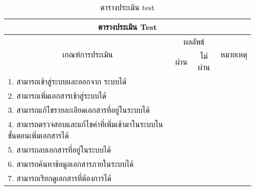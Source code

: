 \begin{table}[H]
\caption{ตารางประเมิน test}\label{tbl:test}
\begin{tabular}{|l|l|l|l|}
\hline
\multicolumn{4}{|c|}{ตารางประเมิน Test}                                                                                                                                             \\ \hline
\multicolumn{1}{|c|}{\multirow{2}{*}{เกณฑ์การประเมิน}}                  & \multicolumn{2}{c|}{ผลลัพธ์}                             & \multicolumn{1}{c|}{\multirow{2}{*}{หมายเหตุ}} \\ \cline{2-3}
\multicolumn{1}{|c|}{}                                                  & \multicolumn{1}{c|}{ผ่าน} & \multicolumn{1}{c|}{ไม่ผ่าน} & \multicolumn{1}{c|}{}                          \\ \hline
1. สามารถเข้าสู่ระบบและออกจาก ระบบได้                                   &                           &                              &                                                \\ \hline
2. สามารถเพิ่มเอกสารเข้าสู่ระบบได้                                      &                           &                              &                                                \\ \hline
3. สามารถแก้ไขรายละเอียดเอกสารที่อยู่ในระบบได้                          &                           &                              &                                                \\ \hline
4.   สามารถตรวจสอบและแก้ไขคำที่เพิ่มเข้ามาในระบบในขั้นตอนเพิ่มเอกสารได้ &                           &                              &                                                \\ \hline
5. สามารถลบเอกสารที่อยู่ในระบบได้                                       &                           &                              &                                                \\ \hline
6.   สามารถค้นหาข้อมูลเอกสารภายในระบบได้                                &                           &                              &                                                \\ \hline
7.   สามารถเรียกดูเอกสารที่ต้องการได้                                   &                           &                              &                                                \\ \hline
\end{tabular}
\end{table}
